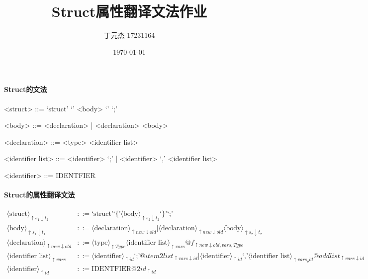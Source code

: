 \documentclass[UTF8]{ctexart}
\title{Struct属性翻译文法作业}
\author{丁元杰 17231164}
\date{\today}
\begin{document}
\maketitle

\paragraph*{Struct的文法}

\begin{grammar}

    <struct> ::= `struct' `{' <body> `}' `;'

    <body> ::= <declaration> | <declaration> <body>

    <declaration> ::= <type> <identifier list>

    <identifier list> ::= <identifier> `;' | <identifier> `,' <identifier list>

    <identifier> ::= IDENTFIER
    
\end{grammar}

\paragraph*{Struct的属性翻译文法}

\begin{align*}
    \langle \text{struct}\rangle _{\uparrow s_1 \downarrow t_2} &::= \text{`struct'} \text{`\{'} \langle \text{body}\rangle _{\uparrow s_2 \downarrow t_2} \text{`\}'} \text{`;'} \\
    \langle \text{body}\rangle _{\uparrow s_1 \downarrow t_1} &::= \langle \text{declaration}\rangle _{\uparrow new \downarrow old} | \langle \text{declaration}\rangle _{\uparrow new \downarrow old} \langle \text{body}\rangle _{\uparrow s_2 \downarrow t_2} \\
    \langle \text{declaration}\rangle _{\uparrow new \downarrow old} &::= \langle \text{type}\rangle _{\uparrow Type} \langle \text{identifier list}\rangle  _{\uparrow vars} @f_{\uparrow new \downarrow old, vars, Type} \\
    \langle \text{identifier list}\rangle _{\uparrow vars} &::= \langle \text{identifier}\rangle _{\uparrow id} \text{`;'} @item2list_{\uparrow vars \downarrow id} | \langle \text{identifier}\rangle _{\uparrow id} \text{`,'} \langle \text{identifier list}\rangle _{\uparrow vars_old} @addlist_{\uparrow vars \downarrow id} \\
    \langle \text{identifier}\rangle _{\uparrow id} &::= \text{IDENTFIER} @2id_{\uparrow id}
\end{align*}
\end{document}
